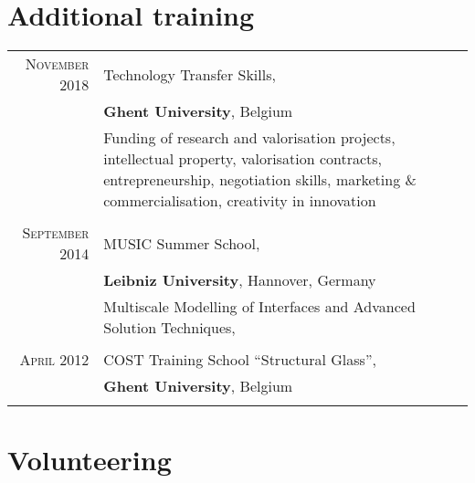 \documentclass[a4paper,10pt]{article} %
\begin{document}
\section{Additional training}

\begin{tabular}{rp{11cm}}	

\textsc{November} 2018 & Technology Transfer Skills,\\
 & \textbf{Ghent University}, Belgium\\
 & \small{Funding of research and valorisation projects, intellectual property, valorisation contracts, entrepreneurship, negotiation skills, marketing \& commercialisation, creativity in innovation}\\

&\\

\textsc{September} 2014 & MUSIC Summer School,\\
 & \textbf{Leibniz University}, Hannover, Germany\\
 & \small{Multiscale Modelling of Interfaces and Advanced Solution Techniques,}\\

&\\

 \textsc{April} 2012 & COST Training School ``Structural Glass'',\\
 & \textbf{Ghent University}, Belgium\\
&\\

\end{tabular}


\section{Volunteering}
\end{document}
